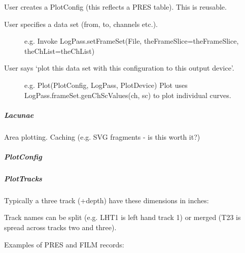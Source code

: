 \documentclass[letterpaper,10pt,english]{sphinxmanual}
\begin{document}
User creates a PlotConfig (this reflects a PRES table). This is reusable.
\begin{description}
\item[{User specifies a data set (from, to, channels etc.).}] \leavevmode
e.g. Invoke LogPass.setFrameSet(File, theFrameSlice=theFrameSlice, theChList=theChList)

\item[{User says ‘plot this data set with this configuration to this output device’.}] \leavevmode
e.g. Plot(PlotConfig, LogPass, PlotDevice)
Plot uses LogPass.frameSet.genChScValues(ch, sc) to plot individual curves.

\end{description}


\subparagraph{Lacunae}
\label{\detokenize{ref/util/plot/Track:lacunae}}
Area plotting.
Caching (e.g. SVG fragments - is this worth it?)


\subparagraph{PlotConfig}
\label{\detokenize{ref/util/plot/Track:plotconfig}}

\subparagraph{PlotTracks}
\label{\detokenize{ref/util/plot/Track:plottracks}}
Typically a three track (+depth) have these dimensions in inches:

\begin{sphinxVerbatim}[commandchars=\\\{\}]
            
                     
               
                   
                   
\end{sphinxVerbatim}

Track names can be split (e.g. LHT1 is left hand track 1) or merged (T23 is
spread across tracks two and three).

Examples of PRES and FILM records:
\end{document}
